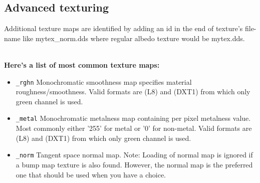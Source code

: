 \documentclass[Orbiter Developer Manual.tex]{subfiles}
\begin{document}
\subsection{Advanced texturing}
Additional texture maps are identified by adding an id in the end of texture's file-name like mytex\_norm.dds where regular albedo texture would be mytex.dds.\\\ 

\textbf{Here's a list of most common texture maps:}
\begin{itemize}
\item	\texttt{\_rghn} Monochromatic smoothness map specifies material roughness/smoothness. Valid formats are (L8) and (DXT1) from which only green channel is used.
\item	\texttt{\_metal} Monochromatic metalness map containing per pixel metalness value. Most commonly either '255' for metal or '0' for non-metal. Valid formats are (L8) and (DXT1) from which only green channel is used.
\item	\texttt{\_norm} Tangent space normal map. Note: Loading of normal map is ignored if a bump map texture is also found. However, the normal map is the preferred one that should be used when you have a choice. 
\end{itemize}
\end{document}
